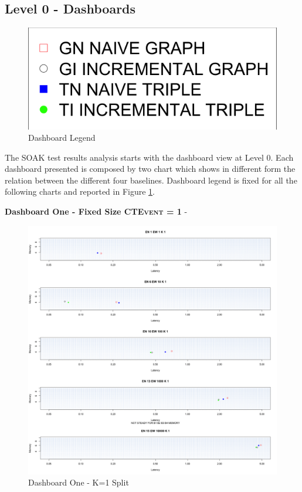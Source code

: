 \subsection{Level 0 - Dashboards}\label{sec:eval-level0}

\begin{figure}[tbh]
	\centering
	\includegraphics[width=0.25\linewidth]{images/dashboard-legend}	
	\caption{Dashboard Legend} 
	\label{fig:dashboard-legend}
\end{figure}

The SOAK test results analysis starts with the dashboard view at Level 0. Each dashboard presented is composed by two chart which shows in different form the relation between the different four baselines. Dashboard legend is fixed for all the following charts and reported in Figure \ref{fig:dashboard-legend}.

\textbf{Dashboard One - Fixed Size \textsc{CTEvent} = 1} - 

\begin{figure}[htb]
	\centering
	\includegraphics[width=0.90\linewidth]{images/dashboard-1-split}	
	\caption[\textsc{Analyser} Investigation Stack - Level 0 - Dashboard One - Split Version]{Dashboard One - K=1 Split} 
	\label{fig:result_dashboard_ka}
\end{figure}

